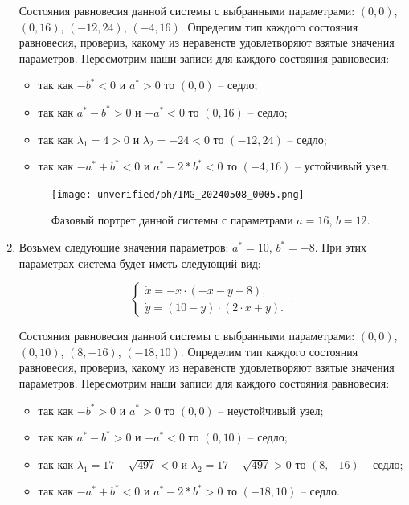 \begin{enumerate}
Состояния равновесия данной системы с выбранными параметрами: $(0, 0)$, $(0, 16)$, $(-12, 24)$, $(-4, 16)$. Определим тип каждого состояния равновесия, проверив, какому из неравенств удовлетворяют взятые значения параметров.  Пересмотрим наши записи для каждого состояния равновесия: 
\begin{itemize}
\item{ так как $-b^\ast  < 0 $ и $a^\ast > 0 $ то $(0, 0)$ -- седло;}
\item{ так как $a^\ast - b^\ast > 0 $ и $-a^\ast  < 0 $ то $(0, 16)$ -- седло;}
\item{ так как ${\lambda_{1}} = 4 > 0 $ и ${\lambda_{2}} = -24  < 0 $ то $(-12, 24)$ -- седло;}
\item{ так как $-a^\ast + b^\ast  < 0 $ и $a^\ast - 2*b^\ast  < 0 $ то $(-4, 16)$ -- устойчивый узел.}
\end{itemize} 

\begin{figure}[!thb]
\texttt{[image: unverified/ph/IMG\_20240508\_0005.png]}
\centering
\caption{\label{fig:bifdiag2} Фазовый портрет данной системы с параметрами $a = 16$, $b = 12$.}
\end{figure}

\newpage
\item

Возьмем следующие значения параметров:  $a^\ast = 10$, $b^\ast = -8$. При этих параметрах система будет иметь следующий вид: 

$$
\left \lbrace 
\begin{matrix} 
\dot{x} = -x \cdot (-x - y - 8), \\
\dot{y} = (10 - y) \cdot (2 \cdot x + y). \
\end{matrix} 
\right . .$$

Состояния равновесия данной системы с выбранными параметрами: $(0, 0)$, $(0, 10)$, $(8, -16)$, $(-18, 10)$. Определим тип каждого состояния равновесия, проверив, какому из неравенств удовлетворяют взятые значения параметров.  Пересмотрим наши записи для каждого состояния равновесия: 
\begin{itemize}
\item{ так как $-b^\ast > 0 $ и $a^\ast > 0 $ то $(0, 0)$ -- неустойчивый узел;}
\item{ так как $a^\ast - b^\ast > 0 $ и $-a^\ast  < 0 $ то $(0, 10)$ -- седло;}
\item{ так как ${\lambda_{1}} = 17 - \sqrt{497}  < 0 $ и ${\lambda_{2}} = 17 + \sqrt{497} > 0 $ то $(8, -16)$ -- седло;}
\item{ так как $-a^\ast + b^\ast  < 0 $ и $a^\ast - 2*b^\ast > 0 $ то $(-18, 10)$ -- седло.}
\end{itemize} 


\end{enumerate}
